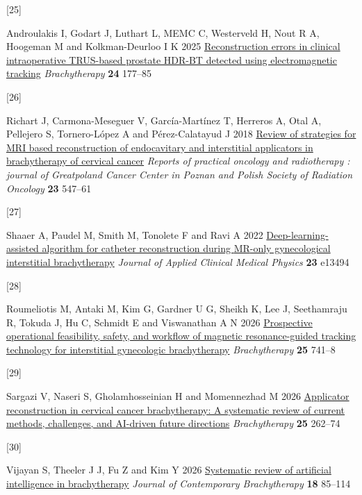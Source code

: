 \documentclass[
  11pt,
]{article}
\newlength{\cslhangindent}
\newlength{\csllabelwidth}
\newenvironment{CSLReferences}[2] %
 {\begin{list}{}{%
  \setlength{\itemindent}{0pt}
  \setlength{\leftmargin}{0pt}
  \setlength{\parsep}{0pt}
  \ifodd #1
   \setlength{\leftmargin}{\cslhangindent}
   \setlength{\itemindent}{-1\cslhangindent}
  \fi
  \setlength{\itemsep}{#2\baselineskip}}}
 {\end{list}}
\newcommand{\CSLLeftMargin}[1]{\parbox[t]{\csllabelwidth}{\strut#1\strut}}
\newcommand{\CSLRightInline}[1]{\parbox[t]{\linewidth - \csllabelwidth}{\strut#1\strut}}
\begin{document}
\begin{CSLReferences}{0}{1}
\CSLLeftMargin{{[}25{]} }%
\CSLRightInline{Androulakis I, Godart J, Luthart L, MEMC C, Westerveld
H, Nout R A, Hoogeman M and Kolkman-Deurloo I K 2025
\href{https://doi.org/10.1016/j.brachy.2024.11.004}{Reconstruction
errors in clinical intraoperative TRUS-based prostate HDR-BT detected
using electromagnetic tracking} \emph{Brachytherapy} \textbf{24}
177--85}

\CSLLeftMargin{{[}26{]} }%
\CSLRightInline{Richart J, Carmona-Meseguer V, García-Martínez T,
Herreros A, Otal A, Pellejero S, Tornero-López A and Pérez-Calatayud J
2018 \href{https://doi.org/10.1016/j.rpor.2018.06.005}{Review of
strategies for MRI based reconstruction of endocavitary and interstitial
applicators in brachytherapy of cervical cancer} \emph{Reports of
practical oncology and radiotherapy : journal of Greatpoland Cancer
Center in Poznan and Polish Society of Radiation Oncology} \textbf{23}
547--61}

\CSLLeftMargin{{[}27{]} }%
\CSLRightInline{Shaaer A, Paudel M, Smith M, Tonolete F and Ravi A 2022
\href{https://doi.org/10.1002/acm2.13494}{Deep-learning-assisted
algorithm for catheter reconstruction during {MR}-only gynecological
interstitial brachytherapy} \emph{Journal of Applied Clinical Medical
Physics} \textbf{23} e13494}

\CSLLeftMargin{{[}28{]} }%
\CSLRightInline{Roumeliotis M, Antaki M, Kim G, Gardner U G, Sheikh K,
Lee J, Seethamraju R, Tokuda J, Hu C, Schmidt E and Viswanathan A N 2026
\href{https://doi.org/10.1016/j.brachy.2026.03.005}{Prospective
operational feasibility, safety, and workflow of magnetic
resonance-guided tracking technology for interstitial gynecologic
brachytherapy} \emph{Brachytherapy} \textbf{25} 741--8}

\CSLLeftMargin{{[}29{]} }%
\CSLRightInline{Sargazi V, Naseri S, Gholamhosseinian H and Momennezhad
M 2026 \href{https://doi.org/10.1016/j.brachy.2025.10.004}{Applicator
reconstruction in cervical cancer brachytherapy: A systematic review of
current methods, challenges, and {AI}-driven future directions}
\emph{Brachytherapy} \textbf{25} 262--74}

\CSLLeftMargin{{[}30{]} }%
\CSLRightInline{Vijayan S, Theeler J J, Fu Z and Kim Y 2026
\href{https://doi.org/10.5114/jcb.2026.160595}{Systematic review of
artificial intelligence in brachytherapy} \emph{Journal of Contemporary
Brachytherapy} \textbf{18} 85--114}


\end{CSLReferences}
\end{document}
